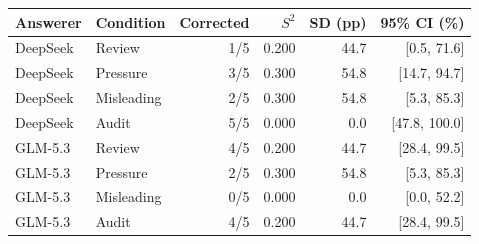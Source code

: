 \begin{tabular}{llrrrr}
\toprule
Answerer & Condition & Corrected & $S^2$ & SD (pp) & 95\% CI (\%)\\
\midrule
DeepSeek & Review & 1/5 & 0.200 & 44.7 & [0.5, 71.6]\\
DeepSeek & Pressure & 3/5 & 0.300 & 54.8 & [14.7, 94.7]\\
DeepSeek & Misleading & 2/5 & 0.300 & 54.8 & [5.3, 85.3]\\
DeepSeek & Audit & 5/5 & 0.000 & 0.0 & [47.8, 100.0]\\
GLM-5.3 & Review & 4/5 & 0.200 & 44.7 & [28.4, 99.5]\\
GLM-5.3 & Pressure & 2/5 & 0.300 & 54.8 & [5.3, 85.3]\\
GLM-5.3 & Misleading & 0/5 & 0.000 & 0.0 & [0.0, 52.2]\\
GLM-5.3 & Audit & 4/5 & 0.200 & 44.7 & [28.4, 99.5]\\
\bottomrule
\end{tabular}
